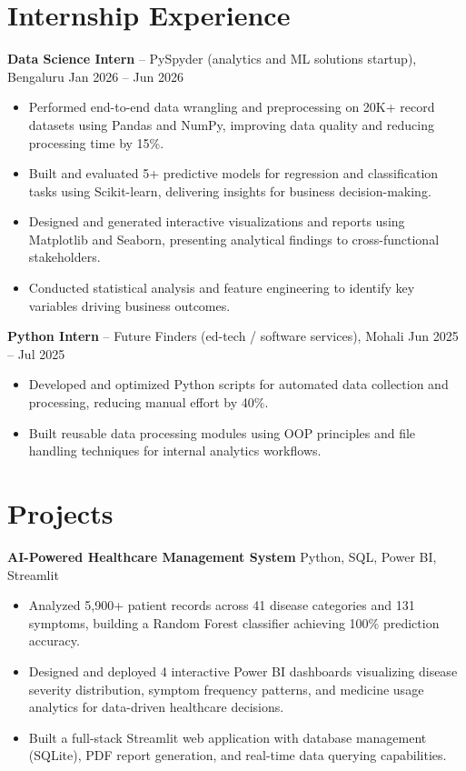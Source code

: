 \documentclass{article}
\begin{document}
\section*{Internship Experience}

\textbf{Data Science Intern} -- PySpyder (analytics and ML solutions startup), Bengaluru \hfill Jan 2026 -- Jun 2026
\begin{itemize}
    \item Performed end-to-end data wrangling and preprocessing on 20K+ record datasets using Pandas and NumPy, improving data quality and reducing processing time by 15\%.
    \item Built and evaluated 5+ predictive models for regression and classification tasks using Scikit-learn, delivering insights for business decision-making.
    \item Designed and generated interactive visualizations and reports using Matplotlib and Seaborn, presenting analytical findings to cross-functional stakeholders.
    \item Conducted statistical analysis and feature engineering to identify key variables driving business outcomes.
\end{itemize}

\vspace{4pt}

\textbf{Python Intern} -- Future Finders (ed-tech / software services), Mohali \hfill Jun 2025 -- Jul 2025
\begin{itemize}
    \item Developed and optimized Python scripts for automated data collection and processing, reducing manual effort by 40\%.
    \item Built reusable data processing modules using OOP principles and file handling techniques for internal analytics workflows.
\end{itemize}

\section*{Projects}

\textbf{AI-Powered Healthcare Management System} \hfill Python, SQL, Power BI, Streamlit
\begin{itemize}
    \item Analyzed 5,900+ patient records across 41 disease categories and 131 symptoms, building a Random Forest classifier achieving 100\% prediction accuracy.
    \item Designed and deployed 4 interactive Power BI dashboards visualizing disease severity distribution, symptom frequency patterns, and medicine usage analytics for data-driven healthcare decisions.
    \item Built a full-stack Streamlit web application with database management (SQLite), PDF report generation, and real-time data querying capabilities.
\end{itemize}
\end{document}
